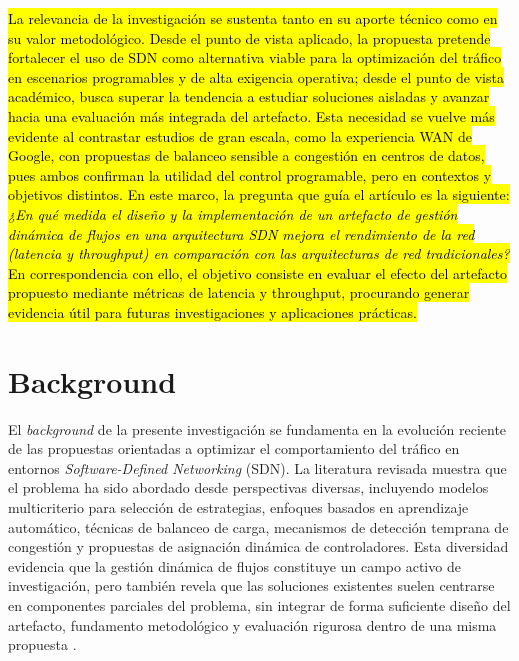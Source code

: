 \documentclass[12pt,a4paper]{article}
\newcommand{\introhl}[2]{%
    {\sethlcolor{#1}\hl{#2}}%
}
\begin{document}
\introhl{introimp}{La relevancia de la investigación se sustenta tanto en su aporte técnico como en su valor metodológico. Desde el punto de vista aplicado, la propuesta pretende fortalecer el uso de SDN como alternativa viable para la optimización del tráfico en escenarios programables y de alta exigencia operativa; desde el punto de vista académico, busca superar la tendencia a estudiar soluciones aisladas y avanzar hacia una evaluación más integrada del artefacto. Esta necesidad se vuelve más evidente al contrastar estudios de gran escala, como la experiencia WAN de Google, con propuestas de balanceo sensible a congestión en centros de datos, pues ambos confirman la utilidad del control programable, pero en contextos y objetivos distintos. En este marco, la pregunta que guía el artículo es la siguiente: \textit{¿En qué medida el diseño y la implementación de un artefacto de gestión dinámica de flujos en una arquitectura SDN mejora el rendimiento de la red (latencia y throughput) en comparación con las arquitecturas de red tradicionales?} En correspondencia con ello, el objetivo consiste en evaluar el efecto del artefacto propuesto mediante métricas de latencia y throughput, procurando generar evidencia útil para futuras investigaciones y aplicaciones prácticas.} \parencite{b4_google_sdn, congestion_lb_datacenter}

\section{Background}

El \textit{background} de la presente investigación se fundamenta en la evolución reciente de las propuestas orientadas a optimizar el comportamiento del tráfico en entornos \textit{Software-Defined Networking} (SDN). La literatura revisada muestra que el problema ha sido abordado desde perspectivas diversas, incluyendo modelos multicriterio para selección de estrategias, enfoques basados en aprendizaje automático, técnicas de balanceo de carga, mecanismos de detección temprana de congestión y propuestas de asignación dinámica de controladores. Esta diversidad evidencia que la gestión dinámica de flujos constituye un campo activo de investigación, pero también revela que las soluciones existentes suelen centrarse en componentes parciales del problema, sin integrar de forma suficiente diseño del artefacto, fundamento metodológico y evaluación rigurosa dentro de una misma propuesta \parencite{survey_ai_sdn, openflow_review}.
\end{document}
